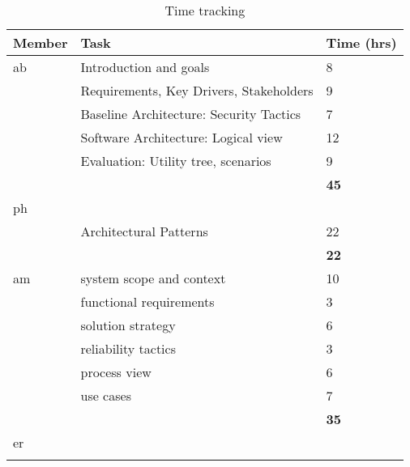 
\begin{table}[H]
	\centering
	\begin{tabularx}{\textwidth}{p{2cm}|X|p{2.5cm}}
		\textbf{Member} & \textbf{Task} & \textbf{Time (hrs)} \\
		\hline
		ab &Introduction and goals                  & 8 \\
		   &Requirements, Key Drivers, Stakeholders & 9  \\
		   &Baseline Architecture: Security Tactics & 7  \\
		   &Software Architecture: Logical view     &12   \\
		   &Evaluation: Utility tree, scenarios     & 9  \\

		& & \textbf{45} \\
		\hline
		ph &  &  \\
			& Architectural Patterns & 22 \\
		& & \textbf{22} \\
		\hline
		am & system scope and context & 10 \\
		 & functional requirements & 3 \\
		 & solution strategy & 6 \\
		 & reliability tactics & 3 \\
		 & process view & 6 \\
		 & use cases & 7 \\
		& & \textbf{35} \\
		\hline
		er &  &  \\
		& & \textbf{} \\
		\hline
	\end{tabularx}
	\caption{Time tracking}
	\label{tab:timetracking-1}
\end{table}
